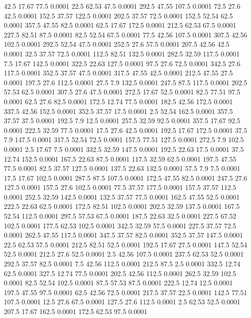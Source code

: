 42.5	17.67	77.5	0.0001
22.5	62.53	47.5	0.0001
292.5	47.55	107.5	0.0001
72.5	27.6	42.5	0.0001
152.5	37.57	122.5	0.0001
202.5	37.57	72.5	0.0001
152.5	52.54	62.5	0.0001
357.5	47.55	82.5	0.0001
62.5	17.67	172.5	0.0001
212.5	62.53	67.5	0.0001
227.5	82.51	87.5	0.0001
82.5	52.54	67.5	0.0001
77.5	42.56	107.5	0.0001
307.5	42.56	102.5	0.0001
292.5	52.54	47.5	0.0001
252.5	27.6	57.5	0.0001
207.5	42.56	42.5	0.0001
32.5	37.57	72.5	0.0001
112.5	82.51	132.5	0.0001
282.5	32.59	117.5	0.0001
7.5	17.67	142.5	0.0001
322.5	22.63	127.5	0.0001
97.5	27.6	72.5	0.0001
342.5	27.6	117.5	0.0001
352.5	37.57	47.5	0.0001
317.5	47.55	42.5	0.0001
212.5	47.55	27.5	0.0001
197.5	27.6	112.5	0.0001
27.5	7.9	132.5	0.0001
247.5	87.5	117.5	0.0001
202.5	57.53	62.5	0.0001
307.5	27.6	47.5	0.0001
272.5	17.67	52.5	0.0001
82.5	77.51	97.5	0.0001
62.5	27.6	82.5	0.0001
172.5	12.74	77.5	0.0001
182.5	42.56	172.5	0.0001
337.5	42.56	152.5	0.0001
352.5	37.57	17.5	0.0001
2.5	52.54	162.5	0.0001
357.5	37.57	37.5	0.0001
192.5	7.9	12.5	0.0001
257.5	32.59	92.5	0.0001
357.5	17.67	92.5	0.0001
222.5	32.59	77.5	0.0001
17.5	27.6	42.5	0.0001
192.5	17.67	172.5	0.0001
37.5	7.9	147.5	0.0001
317.5	52.54	72.5	0.0001
157.5	77.51	127.5	0.0001
272.5	7.9	102.5	0.0001
2.5	17.67	7.5	0.0001
332.5	32.59	147.5	0.0001
192.5	22.63	17.5	0.0001
37.5	12.74	152.5	0.0001
167.5	22.63	87.5	0.0001
117.5	32.59	62.5	0.0001
197.5	47.55	77.5	0.0001
82.5	37.57	127.5	0.0001
137.5	22.63	132.5	0.0001
57.5	7.9	7.5	0.0001
17.5	17.67	102.5	0.0001
287.5	87.5	107.5	0.0001
172.5	47.55	82.5	0.0001
247.5	27.6	127.5	0.0001
157.5	27.6	102.5	0.0001
77.5	37.57	177.5	0.0001
157.5	37.57	112.5	0.0001
252.5	32.59	142.5	0.0001
132.5	37.57	77.5	0.0001
162.5	47.55	52.5	0.0001
222.5	22.63	62.5	0.0001
172.5	82.51	102.5	0.0001
202.5	32.59	137.5	0.0001
167.5	52.54	112.5	0.0001
297.5	57.53	67.5	0.0001
187.5	22.63	32.5	0.0001
227.5	67.52	102.5	0.0001
177.5	62.53	102.5	0.0001
342.5	32.59	57.5	0.0001
227.5	37.57	72.5	0.0001
262.5	47.55	117.5	0.0001
347.5	37.57	82.5	0.0001
352.5	37.57	147.5	0.0001
22.5	62.53	57.5	0.0001
212.5	82.51	52.5	0.0001
192.5	17.67	27.5	0.0001
147.5	52.54	52.5	0.0001
212.5	27.6	52.5	0.0001
2.5	42.56	107.5	0.0001
237.5	62.53	52.5	0.0001
292.5	37.57	82.5	0.0001
7.5	42.56	112.5	0.0001
212.5	87.5	2.5	0.0001
332.5	12.74	62.5	0.0001
327.5	12.74	77.5	0.0001
202.5	42.56	112.5	0.0001
262.5	32.59	102.5	0.0001
82.5	52.54	102.5	0.0001
87.5	57.53	87.5	0.0001
222.5	12.74	12.5	0.0001
197.5	47.55	97.5	0.0001
62.5	42.56	72.5	0.0001
217.5	37.57	22.5	0.0001
142.5	77.51	107.5	0.0001
12.5	27.6	67.5	0.0001
127.5	27.6	112.5	0.0001
2.5	62.53	52.5	0.0001
207.5	17.67	162.5	0.0001
172.5	62.53	97.5	0.0001
